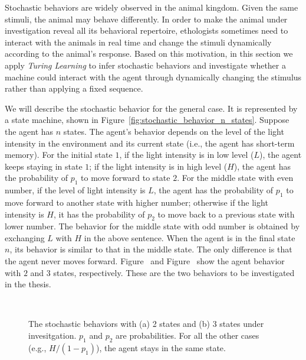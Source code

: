 Stochastic behaviors are widely observed in the animal kingdom. Given the same stimuli, the animal may behave differently. In order to make the animal under investigation reveal all its behavioral repertoire, ethologists sometimes need to interact with the animals in real time and change the stimuli dynamically according to the animal's response. Based on this motivation, in this section we apply \textit{Turing Learning} to infer stochastic behaviors and investigate whether a machine could interact with the agent through dynamically changing the stimulus rather than applying a fixed sequence.

We will describe the stochastic behavior for the general case. It is represented by a state machine, shown in Figure~\ref{fig:stochastic_behavior_n_states}. Suppose the agent has $n$ states. The agent's behavior depends on the level of the light intensity in the environment and its current state (i.e., the agent has short-term memory). For the initial state $1$, if the light intensity is in low level ($L$), the agent keeps staying in state $1$; if the light intensity is in high level ($H$), the agent has the probability of $p_1$ to move forward to state $2$. For the middle state with even number, if the level of light intensity is $L$, the agent has the probability of $p_1$ to move forward to another state with higher number; otherwise if the light intensity is $H$, it has the probability of $p_2$ to move back to a previous state with lower number. The behavior for the middle state with odd number is obtained by exchanging $L$ with $H$ in the above sentence. When the agent is in the final state $n$, its behavior is similar to that in the middle state. The only difference is that the agent never moves forward. Figure~ and Figure~ show the agent behavior with $2$ and $3$ states, respectively. These are the two behaviors to be investigated in the thesis. 

\begin{figure}[!t]%
	\centering
		\\
		\caption{The stochastic behaviors with (a) 2 states and (b) 3 states under invesitgation. $p_1$ and $p_2$ are probabilities. For all the other cases (e.g., $H/(1-p_1)$), the agent stays in the same state.\label{fig:stochastic_interaction_case_study}}
\end{figure}

